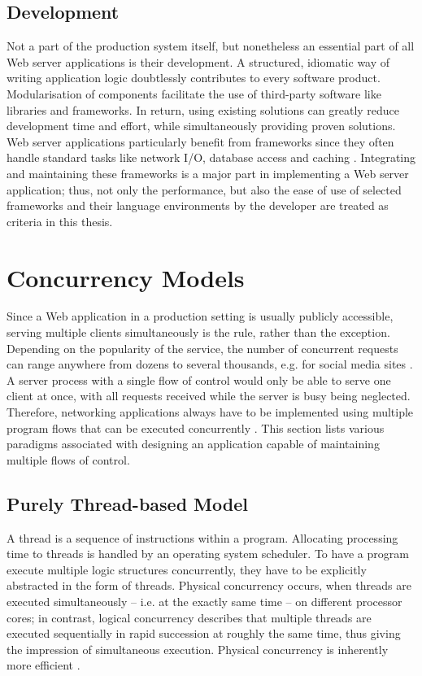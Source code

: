 \subsection{Development}
Not a part of the production system itself, but nonetheless an essential part of all Web server applications is their development. A structured, idiomatic way of writing application logic doubtlessly contributes to every software product. Modularisation of components facilitate the use of third-party software like libraries and frameworks. In return, using existing solutions can greatly reduce development time and effort, while simultaneously providing proven solutions. Web server applications particularly benefit from frameworks since they often handle standard tasks like network I/O, database access and caching \cite[Foreword]{Reelsen2011}. Integrating and maintaining these frameworks is a major part in implementing a Web server application; thus, not only the performance, but also the ease of use of selected frameworks and their language environments by the developer are treated as criteria in this thesis.


\section{Concurrency Models}
\label{sec:concurrency}

Since a Web application in a production setting is usually publicly accessible, serving multiple clients simultaneously is the rule, rather than the exception. Depending on the popularity of the service, the number of concurrent requests can range anywhere from dozens to several thousands, e.g. for social media sites \cite[p. 1]{Drolia2010}. A server process with a single flow of control would only be able to serve one client at once, with all requests received while the server is busy being neglected. Therefore, networking applications always have to be implemented using multiple program flows that can be executed concurrently \cite{Webopedia}. This section lists various paradigms associated with designing an application capable of maintaining multiple flows of control.

\subsection{Purely Thread-based Model}
\label{sec:threads}
A thread is a sequence of instructions within a program. Allocating processing time to threads is handled by an operating system scheduler. To have a program execute multiple logic structures concurrently, they have to be explicitly abstracted in the form of threads. Physical concurrency occurs, when threads are executed simultaneously -- i.e. at the exactly same time -- on different processor cores; in contrast, logical concurrency describes that multiple threads are executed sequentially in rapid succession at roughly the same time, thus giving the impression of simultaneous execution. Physical concurrency is inherently more efficient \cite{ThreadsJava}.

